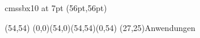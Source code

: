

\font\myfont cmssbx10 at 7pt
\PapierGroesse(56pt,56pt)




\begin{psfigur}(54,54)
\psPolygon[fuellfarbe=0.753,eckradius=5,linienstil=](0,0)(54,0)(54,54)(0,54)
\psNeueSchicht
\rpin(27,25){\myfont Anwendungen}
\end{psfigur}
 

